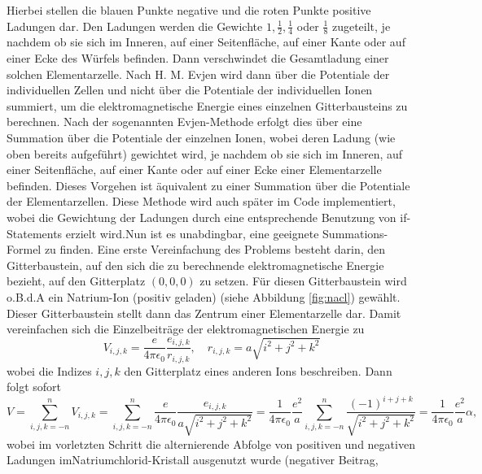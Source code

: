 \documentclass[11pt,a4paper]{article}
\begin{document}
Hierbei stellen die blauen Punkte negative und die roten Punkte positive Ladungen dar. Den Ladungen werden die Gewichte $1, \frac{1}{2}, \frac{1}{4}$ oder $\frac{1}{8}$
zugeteilt, je nachdem ob sie sich im Inneren, auf einer Seitenfläche, auf einer Kante oder auf einer Ecke des Würfels befinden. Dann verschwindet die Gesamtladung einer solchen
Elementarzelle. Nach H. M. Evjen \cite{key2} wird dann über die Potentiale der individuellen Zellen und nicht über die Potentiale der individuellen Ionen summiert, um die elektromagnetische Energie
eines einzelnen Gitterbausteins zu berechnen. Nach der sogenannten Evjen-Methode erfolgt dies über eine Summation über die Potentiale der einzelnen Ionen, wobei deren Ladung (wie oben bereits aufgeführt) gewichtet wird, je nachdem ob sie sich im Inneren,
auf einer Seitenfläche, auf einer Kante oder auf einer Ecke einer Elementarzelle befinden. Dieses Vorgehen ist äquivalent zu einer Summation über die Potentiale der Elementarzellen. Diese Methode
wird auch später im Code implementiert, wobei die Gewichtung der Ladungen durch eine entsprechende Benutzung von if-Statements erzielt wird.\newline Nun ist es unabdingbar, eine geeignete Summations-Formel zu finden.
Eine erste Vereinfachung des Problems besteht darin, den Gitterbaustein, auf den sich die zu berechnende elektromagnetische Energie bezieht, auf den Gitterplatz $(0,0,0)$ zu setzen. Für diesen
Gitterbaustein wird o.B.d.A ein Natrium-Ion (positiv geladen) (siehe Abbildung \ref{fig:nacl}) gewählt. Dieser Gitterbaustein stellt dann das Zentrum einer Elementarzelle dar. Damit vereinfachen sich die Einzelbeiträge der elektromagnetischen Energie zu
\begin{equation*}
    V_{i,j,k} = \frac{e}{4\pi\epsilon_0}\frac{e_{i,j,k}}{r_{i,j,k}}, \quad r_{i,j,k} = a \sqrt{i^2 + j^2 + k^2}
\end{equation*} wobei die Indizes $i,j,k$ den Gitterplatz eines anderen Ions beschreiben. Dann folgt sofort
\begin{equation*}
    V = \sum_{i,j,k=-n}^{n} V_{i,j,k} = \sum_{i,j,k=-n}^{n} \frac{e}{4\pi\epsilon_0} \frac{e_{i,j,k}}{a \sqrt{i^2 + j^2 + k^2}} = \frac{1}{4\pi\epsilon_0} \frac{e^2}{a} \sum_{i,j,k=-n}^{n} \frac{(-1)   ^{i+j+k}}{\sqrt{i^2 + j^2 + k^2}} = \frac{1}{4\pi\epsilon_0} \frac{e^2}{a} \alpha,
\end{equation*} wobei im vorletzten Schritt die alternierende Abfolge von positiven und negativen Ladungen im\newline Natriumchlorid-Kristall ausgenutzt wurde (negativer Beitrag,
\end{document}
